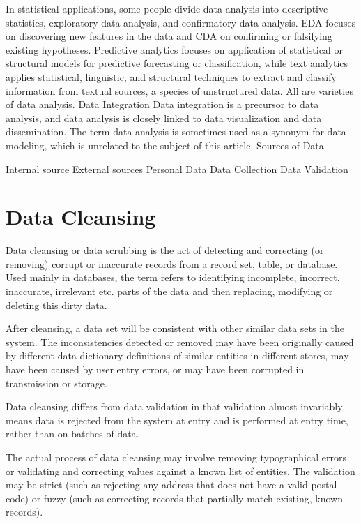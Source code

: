 In statistical applications, some people divide data analysis into descriptive statistics, exploratory data analysis, and confirmatory data analysis. EDA focuses on discovering new features in the data and CDA on confirming or falsifying existing hypotheses. Predictive analytics focuses on application of statistical or structural models for predictive forecasting or classification, while text analytics applies statistical, linguistic, and structural techniques to extract and classify information from textual sources, a species of unstructured data. All are varieties of data analysis.
Data Integration
Data integration is a precursor to data analysis, and data analysis is closely linked to data visualization and data dissemination. 
The term data analysis is sometimes used as a synonym for data modeling, which is unrelated to the subject of this article.
Sources of Data

Internal source
External sources
Personal Data
Data Collection
Data Validation


\section{Data Cleansing}

Data cleansing or data scrubbing is the act of detecting and correcting (or removing) corrupt or inaccurate records from a record set, table, or database. Used mainly in databases, the term refers to identifying incomplete, incorrect, inaccurate, irrelevant etc. parts of the data and then replacing, modifying or deleting this dirty data.

After cleansing, a data set will be consistent with other similar data sets in the system. The inconsistencies detected or removed may have been originally caused by different data dictionary definitions of similar entities in different stores, may have been caused by user entry errors, or may have been corrupted in transmission or storage.

Data cleansing differs from data validation in that validation almost invariably means data is rejected from the system at entry and is performed at entry time, rather than on batches of data.

The actual process of data cleansing may involve removing typographical errors or validating and correcting values against a known list of entities. The validation may be strict (such as rejecting any address that does not have a valid postal code) or fuzzy (such as correcting records that partially match existing, known records).


